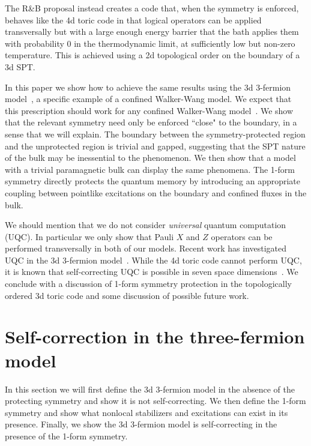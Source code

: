 \documentclass[twocolumn, longbibliography]{revtex4-2}
\begin{document}
The R\&B proposal \cite{RobertsBartlett} instead creates a code that, when the symmetry is enforced, behaves like the 4d toric code in that logical operators can be applied transversally but with a large enough energy barrier that the bath applies them with probability 0 in the thermodynamic limit, at sufficiently low but non-zero temperature. This is achieved using a 2d topological order on the boundary of a 3d SPT. 
	
In this paper we show how to achieve the same results using the 3d 3-fermion model~\cite{BurnellSoluble}, a specific example of a confined Walker-Wang model. We expect that this prescription should work for any confined Walker-Wang model~\cite{WalkerWang, vonKeyserlingkSurfaceAnyons}. We show that the relevant symmetry need only be enforced ``close" to the boundary, in a sense that we will explain. The boundary between the symmetry-protected region and the unprotected region is trivial and gapped, suggesting that the SPT nature of the bulk may be inessential to the phenomenon. 
We then show that a model with a trivial paramagnetic bulk can display the same phenomena. The 1-form symmetry directly protects the quantum memory by introducing an appropriate coupling between pointlike excitations on the boundary and confined fluxes in the bulk. 

We should mention that we do not consider \emph{universal} quantum computation (UQC). In particular we only show that Pauli $X$ and $Z$ operators can be performed transversally in both of our models. Recent work has investigated UQC in the 3d 3-fermion model~\cite{Roberts2020}. 
While the 4d toric code cannot perform UQC, it is known that self-correcting UQC is possible in seven space dimensions~\cite{Bombin2013}.
We conclude with a discussion of 1-form symmetry protection in the topologically ordered 3d toric code and some discussion of possible future work.

\section{Self-correction in the three-fermion model}
	
In this section we will first define the 3d 3-fermion model in the absence of the protecting symmetry and show it is not self-correcting. We then define the 1-form symmetry and show what nonlocal stabilizers and excitations can exist in its presence. Finally, we show the 3d 3-fermion model is self-correcting in the presence of the 1-form symmetry.
\end{document}

